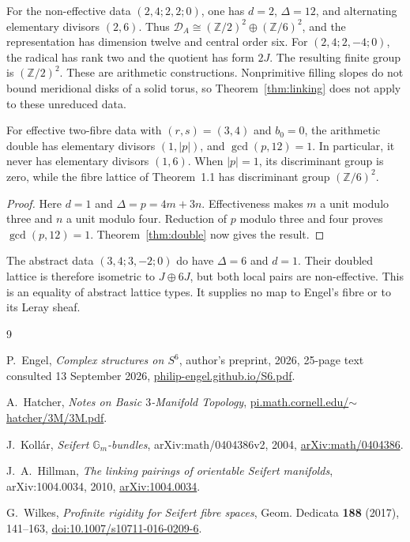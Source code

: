 \documentclass[11pt]{article}
\numberwithin{equation}{section}
\begin{document}
For the non-effective data $(2,4;2,2;0)$, one has
$d=2$, $\Delta=12$, and alternating elementary divisors $(2,6)$.
Thus $\mathcal D_A\cong(\mathbb Z/2)^2\oplus(\mathbb Z/6)^2$,
and the representation has dimension twelve and central order six.
For $(2,4;2,-4;0)$, the radical has rank two and the quotient has
form $2J$.  The resulting finite group is $(\mathbb Z/2)^2$.
These are arithmetic constructions.  Nonprimitive filling slopes do
not bound meridional disks of a solid torus, so Theorem~\ref{thm:linking}
does not apply to these unreduced data.

\begin{proposition}\label{prop:separation}
For effective two-fibre data with $(r,s)=(3,4)$ and $b_0=0$, the
arithmetic double has elementary divisors $(1,|p|)$, and
$\gcd(p,12)=1$.  In particular, it never has elementary divisors
$(1,6)$.  When $|p|=1$, its discriminant group is zero, while the
fibre lattice of Theorem~1.1 has discriminant group $(\mathbb Z/6)^2$.
\end{proposition}

\begin{proof}
Here $d=1$ and $\Delta=p=4m+3n$.
Effectiveness makes $m$ a unit modulo three and $n$ a unit modulo four.
Reduction of $p$ modulo three and four proves $\gcd(p,12)=1$.
Theorem~\ref{thm:double} now gives the result.
\end{proof}

The abstract data $(3,4;3,-2;0)$ do have $\Delta=6$ and $d=1$.
Their doubled lattice is therefore isometric to $J\oplus6J$, but
both local pairs are non-effective.  This is an equality of abstract
lattice types.  It supplies no map to Engel's fibre or to its Leray sheaf.



\clearpage


\begin{thebibliography}{9}
\raggedright

P.~Engel,
\emph{Complex structures on $S^6$},
author's preprint, 2026, 25-page text consulted 13 September 2026,
\href{https://philip-engel.github.io/S6.pdf}{philip-engel.github.io/S6.pdf}.

A.~Hatcher,
\emph{Notes on Basic $3$-Manifold Topology},
\href{https://pi.math.cornell.edu/~hatcher/3M/3M.pdf}
{pi.math.cornell.edu/$\sim$hatcher/3M/3M.pdf}.

J.~Koll\'ar,
\emph{Seifert $\mathbb G_m$-bundles},
arXiv:math/0404386v2, 2004,
\href{https://arxiv.org/abs/math/0404386}{arXiv:math/0404386}.

J.~A.~Hillman,
\emph{The linking pairings of orientable Seifert manifolds},
arXiv:1004.0034, 2010,
\href{https://arxiv.org/abs/1004.0034}{arXiv:1004.0034}.

G.~Wilkes,
\emph{Profinite rigidity for Seifert fibre spaces},
Geom. Dedicata \textbf{188} (2017), 141--163,
\href{https://doi.org/10.1007/s10711-016-0209-6}
{doi:10.1007/s10711-016-0209-6}.

\end{thebibliography}
\end{document}
